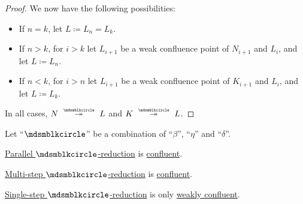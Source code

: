 \begin{proof}
  We now have the following possibilities:
  \begin{itemize}
    \item If \( n = k \), let \( L \coloneqq L_n = L_k \).
    \item If \( n > k \), for \( i > k \) let \( L_{i+1} \) be a weak confluence point of \( N_{i+1} \) and \( L_i \), and let \( L \coloneqq L_n \).
    \item If \( n < k \), for \( i > n \) let \( L_{i+1} \) be a weak confluence point of \( K_{i+1} \) and \( L_i \), and let \( L \coloneqq L_k \).
  \end{itemize}

  In all cases, \( N \pred* L \) and \( K \pred* L \).
\end{proof}

\begin{theorem}\label{thm:church_rosser_theorem}
  Let \enquote{\( {\Anon} \)} be a combination of \enquote{\( \beta \)}, \enquote{\( \eta \)} and \enquote{\( \delta \)}.

  \begin{thmenum}
     \hyperref[def:parallel_reduction]{Parallel \( \Anon \)-reduction} is \hyperref[def:reduction_confluence]{confluent}.

     \hyperref[def:lambda_reduction/multi]{Multi-step \( \Anon \)-reduction} is \hyperref[def:reduction_confluence]{confluent}.

     \hyperref[def:lambda_reduction/single]{Single-step \( \Anon \)-reduction} is only \hyperref[def:reduction_confluence]{weakly confluent}.
  \end{thmenum}
\end{theorem}
